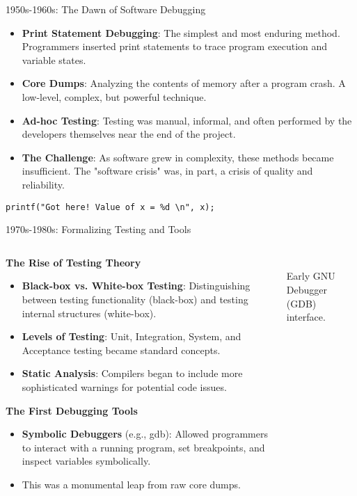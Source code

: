 \documentclass{beamer}
\begin{document}
\begin{frame}{1950s-1960s: The Dawn of Software Debugging}
\begin{itemize}
    \item \textbf{Print Statement Debugging}: The simplest and most enduring method. Programmers inserted print statements to trace program execution and variable states.
    \item \textbf{Core Dumps}: Analyzing the contents of memory after a program crash. A low-level, complex, but powerful technique.
    \item \textbf{Ad-hoc Testing}: Testing was manual, informal, and often performed by the developers themselves near the end of the project.
    \item \textbf{The Challenge}: As software grew in complexity, these methods became insufficient. The "software crisis" was, in part, a crisis of quality and reliability.
\end{itemize}
\begin{center}
    \texttt{printf("Got here! Value of x = \%d \textbackslash n", x);} %
\end{center}
\end{frame}

\begin{frame}{1970s-1980s: Formalizing Testing and Tools}
\begin{columns}
    \begin{column}{0.6\textwidth}
        \textbf{The Rise of Testing Theory}
        \begin{itemize}
            \item \textbf{Black-box vs. White-box Testing}: Distinguishing between testing functionality (black-box) and testing internal structures (white-box).
            \item \textbf{Levels of Testing}: Unit, Integration, System, and Acceptance testing became standard concepts.
            \item \textbf{Static Analysis}: Compilers began to include more sophisticated warnings for potential code issues.
        \end{itemize}
        \textbf{The First Debugging Tools}
        \begin{itemize}
            \item \textbf{Symbolic Debuggers} (e.g., gdb): Allowed programmers to interact with a running program, set breakpoints, and inspect variables symbolically.
            \item This was a monumental leap from raw core dumps.
        \end{itemize}
    \end{column}
    \begin{column}{0.4\textwidth}
        \\\scriptsize{Early GNU Debugger (GDB) interface.}
    \end{column}
\end{columns}
\end{frame}
\end{document}

